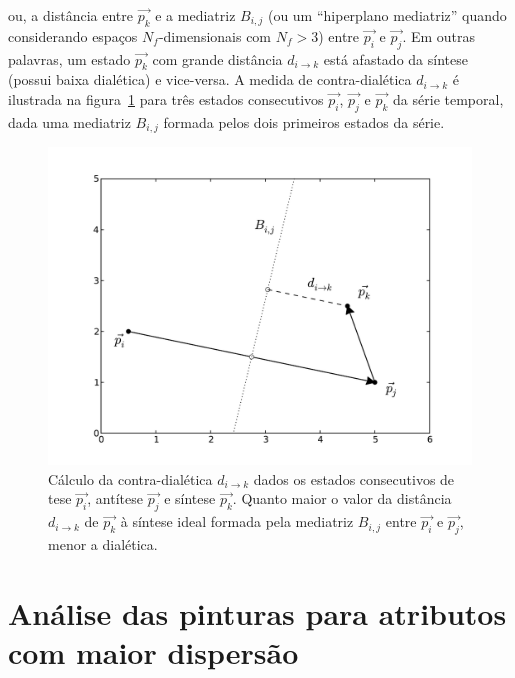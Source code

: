 \noindent ou, a distância entre $\vec{p_k}$ e a mediatriz $B_{i,j}$
(ou um ``hiperplano mediatriz'' quando considerando espaços
$N_f$-dimensionais com $N_f>3$) entre $\vec{p_i}$ e $\vec{p_j}$. Em
outras palavras, um estado $\vec{p_k}$ com grande distância $d_{i
  \rightarrow k}$ está afastado da síntese (possui baixa dialética) e
vice-versa. A medida de contra-dialética $d_{i \rightarrow k}$ é
ilustrada na figura~\ref{fig:desc_dialetica} para três estados
consecutivos $\vec{p_i}$, $\vec{p_j}$ e $\vec{p_k}$ da série temporal,
dada uma mediatriz $B_{i,j}$ formada pelos dois primeiros estados da
série.

\begin{figure}[ht!]
\begin{center}
      \caption{Cálculo da contra-dialética $d_{i \rightarrow k}$ dados os
        estados consecutivos de tese $\vec{p_i}$, antítese $\vec{p_j}$ e síntese
        $\vec{p_k}$. Quanto maior o valor da distância $d_{i \rightarrow k}$ de
        $\vec{p_k}$ à síntese ideal formada pela mediatriz $B_{i,j}$ entre
        $\vec{p_i}$ e $\vec{p_j}$, menor a dialética.  }
        \label{fig:desc_dialetica}
        \includegraphics[scale=.6]{figs/desc_dialetica.pdf}
      \fonteminha
\end{center}
\end{figure}


\section{Análise das pinturas para atributos com maior dispersão}
\label{sec:pares}

